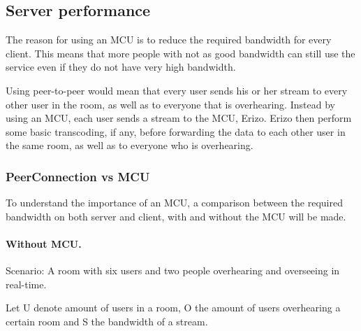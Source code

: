 \documentclass[12pt, titlepage]{article}
\begin{document}
\subsection{Server performance}
The reason for using an MCU is to reduce the required bandwidth for every client. This means that more people with not as good bandwidth can still use the service even if they do not have very high bandwidth. 

Using peer-to-peer would mean that every user sends his or her stream to every other user in the room, as well as to everyone that is overhearing. Instead by using an MCU, each user sends a stream to the MCU, Erizo. Erizo then perform some basic transcoding, if any, before forwarding the data to each other user in the same room, as well as to everyone who is overhearing.

\subsubsection{PeerConnection vs MCU}
To understand the importance of an MCU, a comparison between the required bandwidth on both server and client, with and without the MCU will be made.
\paragraph{Without MCU.}
Scenario: A room with six users and two people overhearing and overseeing in real-time.

Let U denote amount of users in a room, O the amount of users overhearing a certain room and S the bandwidth of a stream. 
\end{document}
